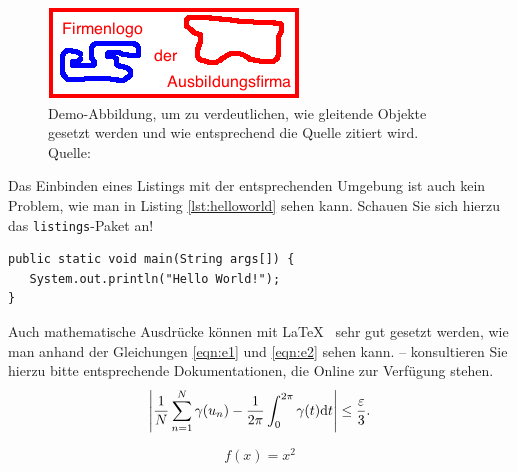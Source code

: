 \begin{figure}
	\centering 
	\includegraphics{img/firmenlogo.jpg}
	\captionsetup{format=hang}
	\caption[Optionaler Kurztitel für das Abbildunggsverzeichnis]{\label{fig:test}Demo-Abbildung, um zu verdeutlichen, wie gleitende Objekte gesetzt werden und wie entsprechend die Quelle zitiert wird. \\Quelle: \cite[][S. 223]{Lamport1978}}
\end{figure}
	
Das Einbinden eines Listings mit der entsprechenden Umgebung ist auch kein Problem, wie man in Listing \vref{lst:helloworld} sehen kann. Schauen Sie sich hierzu das \texttt{listings}-Paket an! 
	
	
\lstset{language=Java}
\begin{lstlisting}[caption={Hello World!}, label={lst:helloworld}]
public static void main(String args[]) {
   System.out.println("Hello World!");
}
\end{lstlisting}

Auch mathematische Ausdrücke können mit \LaTeX~ sehr gut gesetzt werden, wie man anhand der Gleichungen \vref{eqn:e1} und \vref{eqn:e2} sehen kann. -- konsultieren Sie hierzu bitte entsprechende Dokumentationen, die Online zur Verfügung stehen.
\begin{equation}
\left|{1\over N}\sum_{n=1}^N \gamma(u_n)-{1\over 2\pi}\int_0^{2\pi}\gamma(t){\rm d}t\right| \le {\varepsilon\over 3}.\\
\label{eqn:e1}
\end{equation}

\begin{equation}
f(x)=x^2
\label{eqn:e2}
\end{equation}


